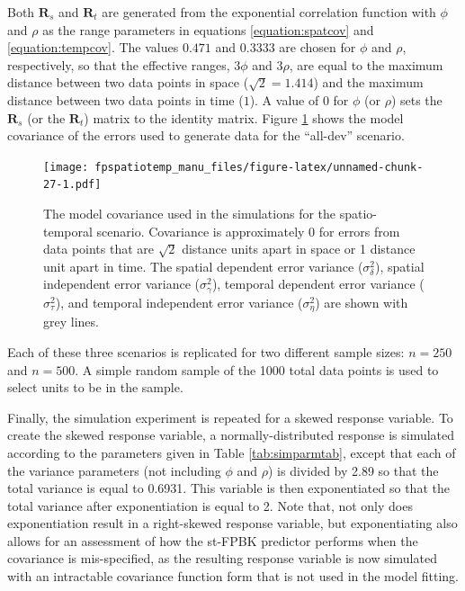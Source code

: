 \documentclass[]{interact}
\theoremstyle{plain}%
\theoremstyle{definition}
\theoremstyle{remark}
\begin{document}
Both \(\mathbf{R}_{s}\) and \(\mathbf{R}_t\) are generated from the
exponential correlation function with \(\phi\) and \(\rho\) as the range
parameters in equations \ref{equation:spatcov} and
\ref{equation:tempcov}. The values \(0.471\) and \(0.3333\) are chosen
for \(\phi\) and \(\rho\), respectively, so that the effective ranges,
\(3 \phi\) and \(3 \rho\), are equal to the maximum distance between two
data points in space (\(\sqrt2 = 1.414\)) and the maximum distance
between two data points in time (\(1\)). A value of 0 for \(\phi\) (or
\(\rho\)) sets the \(\mathbf{R}_{s}\) (or the \(\mathbf{R}_t\)) matrix
to the identity matrix. Figure \ref{fig:simcovplot} shows the model
covariance of the errors used to generate data for the ``all-dev''
scenario.

\begin{figure}
\centering
\texttt{[image: fpspatiotemp\_manu\_files/figure-latex/unnamed-chunk-27-1.pdf]}
\caption{\label{fig:simcovplot} The model covariance used in the
simulations for the spatio-temporal scenario. Covariance is
approximately 0 for errors from data points that are \(\sqrt2\) distance
units apart in space or 1 distance unit apart in time. The spatial
dependent error variance (\(\sigma^2_{\delta}\)), spatial independent
error variance (\(\sigma^2_{\gamma}\)), temporal dependent error
variance (\(\sigma^2_{\tau}\)), and temporal independent error variance
(\(\sigma^2_{\eta}\)) are shown with grey lines.}
\end{figure}

Each of these three scenarios is replicated for two different sample
sizes: \(n = 250\) and \(n = 500\). A simple random sample of the 1000
total data points is used to select units to be in the sample.

Finally, the simulation experiment is repeated for a skewed response
variable. To create the skewed response variable, a normally-distributed
response is simulated according to the parameters given in Table
\ref{tab:simparmtab}, except that each of the variance parameters (not
including \(\phi\) and \(\rho\)) is divided by 2.89 so that the total
variance is equal to 0.6931. This variable is then exponentiated so that
the total variance after exponentiation is equal to 2. Note that, not
only does exponentiation result in a right-skewed response variable, but
exponentiating also allows for an assessment of how the st-FPBK
predictor performs when the covariance is mis-specified, as the
resulting response variable is now simulated with an intractable
covariance function form that is not used in the model fitting.
\end{document}
